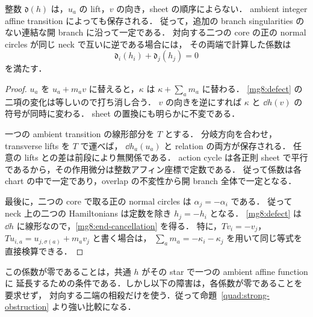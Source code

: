 \begin{lemma}[分岐係数の不変性]\label{mg8:invariance}
整数 $\mathfrak d(h)$ は，$u_a$ の lift，$v$ の向き，sheet の順序によらない．
ambient integer affine transition によっても保存される．
従って，追加の branch singularities のない連結な開 branch に沿って一定である．
対向する二つの core の正の normal circles が同じ neck で互いに逆である場合には，
その両端で計算した係数は
\begin{equation}\label{mg8:end-cancellation}
 \mathfrak d_i(h_i)+\mathfrak d_j(h_j)=0
\end{equation}
を満たす．
\end{lemma}

\begin{proof}
$u_a$ を $u_a+m_av$ に替えると，$\kappa$ は $\kappa+\sum_a m_a$ に替わる．
\eqref{mg8:defect} の二項の変化は等しいので打ち消し合う．
$v$ の向きを逆にすれば $\kappa$ と $\dd h(v)$ の符号が同時に変わる．
sheet の置換にも明らかに不変である．

一つの ambient transition の線形部分を $T$ とする．
分岐方向を合わせ，transverse lifts を $T$ で運べば，
$\dd h_a(u_a)$ と relation の両方が保存される．
任意の lifts との差は前段により無関係である．
action cycle は各正則 sheet で平行であるから，その作用微分は整数アフィン座標で定数である．
従って係数は各 chart の中で一定であり，overlap の不変性から開 branch 全体で一定となる．

最後に，二つの core で取る正の normal circles は $\alpha_j=-\alpha_i$ である．
従って neck 上の二つの Hamiltonians は定数を除き $h_j=-h_i$ となる．
\eqref{mg8:defect} は $\dd h$ に線形なので，\eqref{mg8:end-cancellation} を得る．
特に，$T v_i=-v_j$，$T u_{i,a}=u_{j,\sigma(a)}+m_av_j$ と書く場合は，
$\sum_a m_a=-\kappa_i-\kappa_j$ を用いて同じ等式を直接検算できる．
\end{proof}

この係数が零であることは，共通 $h$ がその star で一つの ambient affine function に
延長するための条件である．しかし以下の障害は，各係数が零であることを要求せず，
対向する二端の相殺だけを使う．従って命題~\ref{quad:strong-obstruction} より強い比較になる．



